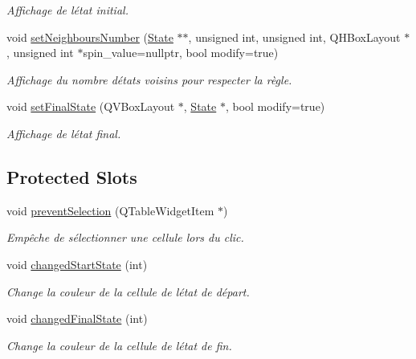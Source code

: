 \begin{DoxyCompactItemize}
\begin{DoxyCompactList}\small\item\em Affichage de l\textquotesingle{}état initial. \end{DoxyCompactList}\item 
void \mbox{\hyperlink{class_transition_a3b0e0fbb3e6a5c15fa13d223b14d9362}{set\+Neighbours\+Number}} (\mbox{\hyperlink{class_state}{State}} $\ast$$\ast$, unsigned int, unsigned int, Q\+H\+Box\+Layout $\ast$, unsigned int $\ast$spin\+\_\+value=nullptr, bool modify=true)
\begin{DoxyCompactList}\small\item\em Affichage du nombre d\textquotesingle{}états voisins pour respecter la règle. \end{DoxyCompactList}\item 
void \mbox{\hyperlink{class_transition_a0b24f3ae042d481056b091693ba94a1b}{set\+Final\+State}} (Q\+V\+Box\+Layout $\ast$, \mbox{\hyperlink{class_state}{State}} $\ast$, bool modify=true)
\begin{DoxyCompactList}\small\item\em Affichage de l\textquotesingle{}état final. \end{DoxyCompactList}\end{DoxyCompactItemize}
\subsection*{Protected Slots}
\begin{DoxyCompactItemize}
\item 
void \mbox{\hyperlink{class_transition_a158a337c6fd1b2d5efce9f6d98d223e8}{prevent\+Selection}} (Q\+Table\+Widget\+Item $\ast$)
\begin{DoxyCompactList}\small\item\em Empêche de sélectionner une cellule lors du clic. \end{DoxyCompactList}\item 
void \mbox{\hyperlink{class_transition_a690a555fe7afec1c233f87cacddcbf1e}{changed\+Start\+State}} (int)
\begin{DoxyCompactList}\small\item\em Change la couleur de la cellule de l\textquotesingle{}état de départ. \end{DoxyCompactList}\item 
void \mbox{\hyperlink{class_transition_a80271cb2e27999c5ec1d9fe6ee4057f4}{changed\+Final\+State}} (int)
\begin{DoxyCompactList}\small\item\em Change la couleur de la cellule de l\textquotesingle{}état de fin. \end{DoxyCompactList}\end{DoxyCompactItemize}
